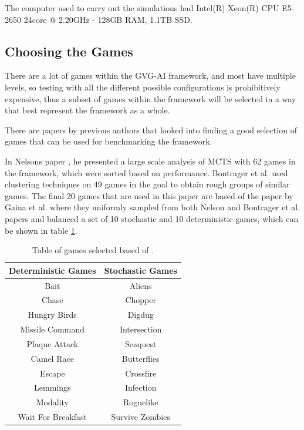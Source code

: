 \documentclass[journal]{IEEEtran}
\begin{document}
	The computer used to carry out the simulations had Intel(R) Xeon(R) CPU E5-2650 24core @ 2.20GHz - 128GB RAM, 1.1TB SSD.

	\subsection{Choosing the Games}
	
	There are a lot of games within the GVG-AI framework, and most have multiple levels, so testing with all the different possible configurations is prohibitively expensive, thus a subset of games within the framework will be selected in a way that best represent the framework as a whole.
	
	There are papers by previous authors that looked into finding a good selection of games that can be used for benchmarking the framework. \cite{gaina2017population}
	
	In Nelsons paper \cite{nelson2016investigating}, he presented a large scale analysis of MCTS with 62 games in the framework, which were sorted based on performance. Bontrager et al. \cite{bontrager2016matching} used clustering techniques on 49 games in the goal to obtain rough groups of similar games.
	The final 20 games that are used in this paper are based of the paper by Gaina et al. \cite{gaina2017population} where they uniformly sampled from both Nelson and Bontrager et al. papers and balanced a set of 10 stochastic and 10 deterministic games, which can be shown in table \ref{GamesTable}.
	
	
	\begin{table}[h!]
	\centering
	\begin{tabular} { |c||c|} 
		 \hline
		 \bf{Deterministic Games} & \bf{Stochastic Games} \\
		 \hline
		 Bait & Aliens  \\
 		Chase  & Chopper   \\
		Hungry Birds  & Digdug   \\
		Missile Command  & Intersection   \\
		Plaque Attack  & Seaquest   \\
		Camel Race  & Butterflies   \\
		Escape  & Crossfire   \\
		Lemmings  & Infection   \\
		Modality  & Roguelike   \\
		Wait For Breakfast  & Survive Zombies   \\
		\hline
	\end{tabular}
	\caption{ Table of games selected based of \cite{guerrero2017beyond, gaina2017population}.}
	\label{GamesTable}
	\end{table}
\end{document}
